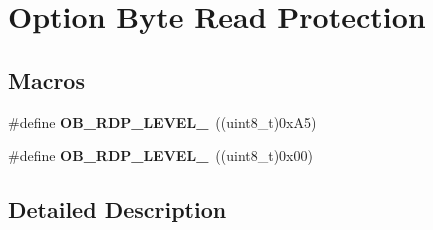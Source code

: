 \hypertarget{group___f_l_a_s_h_ex___o_b___read___protection}{}\section{Option Byte Read Protection}
\label{group___f_l_a_s_h_ex___o_b___read___protection}
\subsection*{Macros}
\begin{DoxyCompactItemize}
\item 
\mbox{\label{group___f_l_a_s_h_ex___o_b___read___protection_ga22c7871bda267a2844ab9ca9f7bd38e4}} 
\#define {\bfseries O\+B\+\_\+\+R\+D\+P\+\_\+\+L\+E\+V\+E\+L\+\_}~((uint8\+\_\+t)0x\+A5)
\item 
\mbox{\label{group___f_l_a_s_h_ex___o_b___read___protection_ga778207f0d12d87bbff9d55e985aba5bc}} 
\#define {\bfseries O\+B\+\_\+\+R\+D\+P\+\_\+\+L\+E\+V\+E\+L\+\_}~((uint8\+\_\+t)0x00)
\end{DoxyCompactItemize}


\subsection{Detailed Description}
